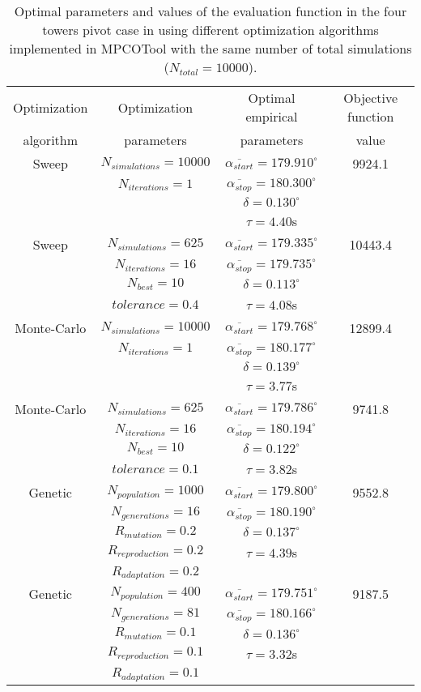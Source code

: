 \documentclass[review,authoryear]{elsarticle}
\newcommand{\TABLE}[5]
{
	\begin{table}[ht!]
		\centering
		\caption{#4.\label{#5}}
		#1
		\begin{tabular}{#2}
			#3
		\end{tabular}
	\end{table}
}
\begin{document}
\TABLE{\scriptsize}{cccc}
{
	Optimization & Optimization & Optimal empirical & Objective function
	\\ algorithm & parameters & parameters & value
	\\ \hline
	Sweep & $N_{simulations}=10000$ & $\overline{\alpha_{start}}=179.910^\circ$
	& 9924.1
	\\ & $N_{iterations}=1$ & $\overline{\alpha_{stop}}=180.300^\circ$
	\\ & & $\delta=0.130^\circ$
	\\ & & $\tau=4.40$s
	\\ \hline
	Sweep & $N_{simulations}=625$ & $\overline{\alpha_{start}}=179.335^\circ$
	& 10443.4
	\\ & $N_{iterations}=16$ & $\overline{\alpha_{stop}}=179.735^\circ$
	\\ & $N_{best}=10$ & $\delta=0.113^\circ$
	\\ & $tolerance=0.4$ & $\tau=4.08$s
	\\ \hline
	Monte-Carlo & $N_{simulations}=10000$
	& $\overline{\alpha_{start}}=179.768^\circ$ & 12899.4
	\\ & $N_{iterations}=1$ & $\overline{\alpha_{stop}}=180.177^\circ$
	\\ & & $\delta=0.139^\circ$
	\\ & & $\tau=3.77$s
	\\ \hline
	Monte-Carlo & $N_{simulations}=625$
	& $\overline{\alpha_{start}}=179.786^\circ$ & 9741.8
	\\ & $N_{iterations}=16$ & $\overline{\alpha_{stop}}=180.194^\circ$
	\\ & $N_{best}=10$ & $\delta=0.122^\circ$
	\\ & $tolerance=0.1$ & $\tau=3.82$s
	\\ \hline
	Genetic & $N_{population}=1000$ & $\overline{\alpha_{start}}=179.800^\circ$
	& 9552.8
	\\ & $N_{generations}=16$ & $\overline{\alpha_{stop}}=180.190^\circ$
	\\ & $R_{mutation}=0.2$ & $\delta=0.137^\circ$
	\\ & $R_{reproduction}=0.2$ & $\tau=4.39$s
	\\ & $R_{adaptation}=0.2$
	\\ \hline
	Genetic & $N_{population}=400$ & $\overline{\alpha_{start}}=179.751^\circ$
	& 9187.5
	\\ & $N_{generations}=81$ & $\overline{\alpha_{stop}}=180.166^\circ$
	\\ & $R_{mutation}=0.1$ & $\delta=0.136^\circ$
	\\ & $R_{reproduction}=0.1$ & $\tau=3.32$s
	\\ & $R_{adaptation}=0.1$
	\\ \hline
}{Optimal parameters and values of the evaluation function in the four towers pivot case in \citet{Ouazaa15} using different optimization algorithms implemented in MPCOTool with the same number of total simulations ($N_{total}=10000$)}{TabPivot}
\end{document}
